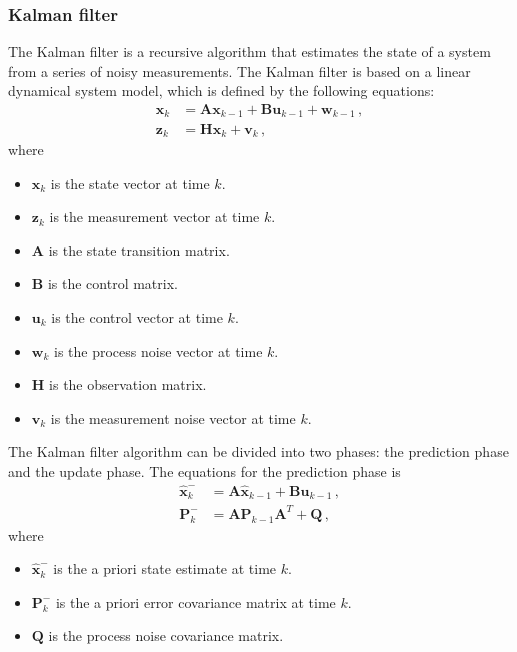 \subsubsection{Kalman filter} \label{subsubsec:kalman_filter}
The Kalman filter is a recursive algorithm that estimates the state of a system from a series of noisy measurements. The Kalman filter is based on a linear dynamical system model, which is defined by the following equations:
\begin{equation}
  \begin{aligned}
    \mathbf{x}_k & = \mathbf{Ax}_{k - 1} + \mathbf{Bu}_{k - 1} + \mathbf{w}_{k - 1}\,, \\
    \mathbf{z}_k & = \mathbf{Hx}_k + \mathbf{v}_k\,,
  \end{aligned}
  \label{eq:kalman_filter}
\end{equation}
where
\begin{itemize}
  \item $\mathbf{x}_k$ is the state vector at time $k$.
  \item $\mathbf{z}_k$ is the measurement vector at time $k$.
  \item $\mathbf{A}$ is the state transition matrix.
  \item $\mathbf{B}$ is the control matrix.
  \item $\mathbf{u}_k$ is the control vector at time $k$.
  \item $\mathbf{w}_k$ is the process noise vector at time $k$.
  \item $\mathbf{H}$ is the observation matrix.
  \item $\mathbf{v}_k$ is the measurement noise vector at time $k$.
\end{itemize}

The Kalman filter algorithm can be divided into two phases: the prediction phase and the update phase. The equations for the prediction phase is
\begin{equation}
  \begin{aligned}
    \hat{\mathbf{x}}_k^- & = \mathbf{A}\hat{\mathbf{x}}_{k - 1} + \mathbf{B}\mathbf{u}_{k - 1}\,, \\
    \mathbf{P}_k^-       & = \mathbf{AP}_{k - 1}\mathbf{A}^T + \mathbf{Q}\,,
  \end{aligned}
  \label{eq:kalman_filter_prediction}
\end{equation}
where
\begin{itemize}
  \item $\hat{\mathbf{x}}_k^-$ is the a priori state estimate at time $k$.
  \item $\mathbf{P}_k^-$ is the a priori error covariance matrix at time $k$.
  \item $\mathbf{Q}$ is the process noise covariance matrix.
\end{itemize}

